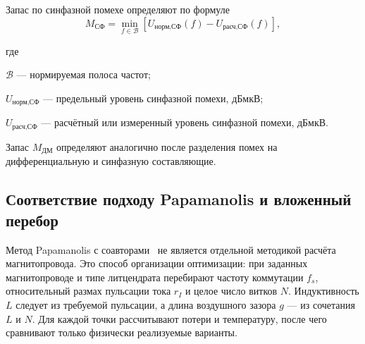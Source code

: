\documentclass[14pt,a4paper]{extarticle}
\newenvironment{whereblock}
 {\par\noindent где\par
  \begin{list}{}{\setlength{\leftmargin}{12.5mm}
                  \setlength{\itemindent}{-12.5mm}
                  \setlength{\itemsep}{0pt}
                  \setlength{\parsep}{0pt}
                  \setlength{\topsep}{0pt}}}
 {\end{list}}
\newcommand{\whereitem}[2]{\item[] #1 --- #2}
\begin{document}
Запас по синфазной помехе определяют по формуле
\begin{equation}
 M_{\text{СФ}}=
 \min_{f\in\mathcal B}
 \left[
 U_{\text{норм,СФ}}(f)-
 U_{\text{расч,СФ}}(f)
 \right],
 \label{eq:cm-margin}
\end{equation}
\begin{whereblock}
\whereitem{$\mathcal B$}{нормируемая полоса частот;}
\whereitem{$U_{\text{норм,СФ}}$}{предельный уровень синфазной помехи,
дБмкВ;}
\whereitem{$U_{\text{расч,СФ}}$}{расчётный или измеренный уровень
синфазной помехи, дБмкВ.}
\end{whereblock}

Запас $M_{\text{ДМ}}$ определяют аналогично после разделения помех на
дифференциальную и синфазную составляющие.

\subsection{Соответствие подходу Papamanolis и вложенный перебор}
\label{subsec:papamanolis-search}

Метод Papamanolis с соавторами~\cite{papamanolis} не является отдельной
методикой расчёта магнитопровода. Это способ организации оптимизации:
при заданных магнитопроводе и типе литцендрата перебирают частоту
коммутации $f_s$, относительный размах пульсации тока $r_I$ и целое число
витков $N$. Индуктивность $L$ следует из требуемой пульсации, а длина
воздушного зазора $g$ --- из сочетания $L$ и $N$. Для каждой точки
рассчитывают потери и температуру, после чего сравнивают только физически
реализуемые варианты.
\end{document}
